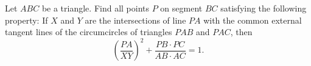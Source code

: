 Let $ABC$ be a triangle.  Find all points $P$ on segment $BC$ satisfying the following property:  If $X$ and $Y$ are the intersections of line $PA$ with the common external tangent lines of the circumcircles of triangles $PAB$ and $PAC$,  then \[\left(\frac{PA}{XY}\right)^2+\frac{PB\cdot PC}{AB\cdot AC}=1.\]